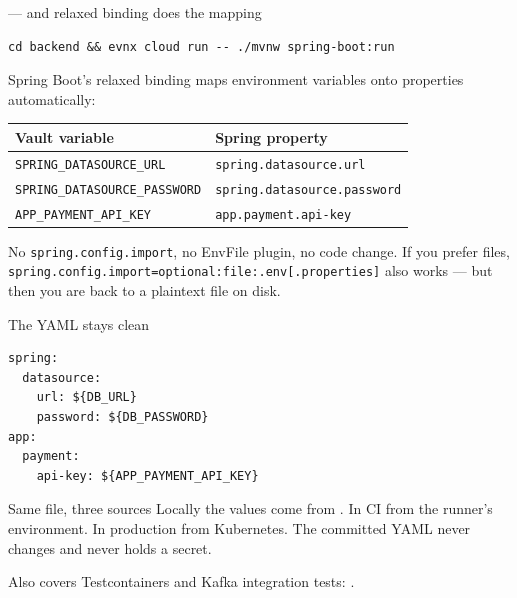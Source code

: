 \documentclass[aspectratio=169,10pt]{beamer}
\begin{document}
\begin{frame}[fragile]{ --- and relaxed binding does the mapping}
\begin{lstlisting}[style=evnxcode]
cd backend && evnx cloud run -- ./mvnw spring-boot:run
\end{lstlisting}

  \vspace{0.6em}
  Spring Boot's relaxed binding maps environment variables onto properties
  automatically:

  \vspace{0.4em}
  \begin{center}\small
  \begin{tabular}{@{}ll@{}}
    \toprule
    \textbf{Vault variable} & \textbf{Spring property} \\
    \midrule
    \texttt{SPRING\_DATASOURCE\_URL}   & \texttt{spring.datasource.url} \\
    \texttt{SPRING\_DATASOURCE\_PASSWORD} & \texttt{spring.datasource.password} \\
    \texttt{APP\_PAYMENT\_API\_KEY}    & \texttt{app.payment.api-key} \\
    \bottomrule
  \end{tabular}
  \end{center}

  \vspace{0.6em}
  {\footnotesize No \texttt{spring.config.import}, no EnvFile plugin, no code
  change. If you prefer files, \texttt{spring.config.import=optional:file:.env[.properties]}
  also works --- but then you are back to a plaintext file on disk.}
\end{frame}

\begin{frame}[fragile]{The YAML stays clean}
\begin{lstlisting}[style=evnxcode]
spring:
  datasource:
    url: ${DB_URL}
    password: ${DB_PASSWORD}
app:
  payment:
    api-key: ${APP_PAYMENT_API_KEY}
\end{lstlisting}

  \vspace{0.7em}
  \begin{block}{Same file, three sources}
    Locally the values come from . In CI from the runner's
    environment. In production from Kubernetes. The committed YAML never
    changes and never holds a secret.
  \end{block}

  \vspace{0.5em}
  {\footnotesize Also covers Testcontainers and Kafka integration tests:
  .}
\end{frame}
\end{document}
